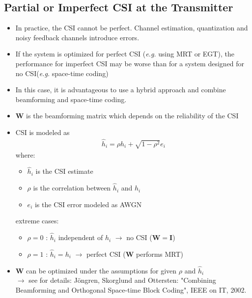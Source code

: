 \documentclass[a4paper, 10pt]{article}
\begin{document}
\subsection{Partial or Imperfect CSI at the Transmitter}
\begin{itemize}
	\item In practice, the CSI cannot be perfect. Channel estimation, quantization and noisy feedback channels introduce errors.
	\item If the system is optimized for perfect CSI (\textit{e.g.} using MRT or EGT), the performance for imperfect CSI may be worse than for a system designed for no CSI(\textit{e.g.} space-time coding)
	\item In this case, it is advantageous to use a hybrid approach and combine beamforming and space-time coding.
\end{itemize}
\begin{figure}[h]
	\centering
	
\end{figure}
\begin{itemize}
	\item $\mathbf{W}$ is the beamforming matrix which depends on the reliability of the CSI
	\item CSI is modeled as
	\begin{align*}
	\hat{h}_i=\rho h_i+\sqrt{1-\rho^2}e_i
	\end{align*}
	where:
		\begin{itemize}
			\item $\hat{h}_i$ is the CSI estimate
			\item $\rho$ is the correlation between $\hat{h}_i$ and $h_i$
			\item $e_i$ is the CSI error modeled as AWGN
		\end{itemize}
	extreme cases:
		\begin{itemize}
			\item $\rho = 0$ : $\hat{h}_i$ independent of $h_i$ $\rightarrow$ no CSI ($\mathbf{W}=\mathbf{I}$)
			\item $\rho = 1$ : $\hat{h}_i=h_i$ $\rightarrow$ perfect CSI ($\mathbf{W}$ performs MRT)
		\end{itemize}
	\item $\mathbf{W}$ can be optimized under the assumptions for given $\rho$ and $\hat{h}_i$\\
	$\rightarrow$ see for details: J\"ongren, Skorglund and Ottersten: "Combining Beamforming and Orthogonal Space-time Block Coding", IEEE on IT, 2002.
\end{itemize}
\end{document}
